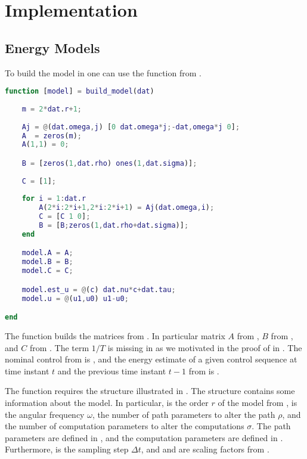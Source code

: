 
\chapter{\color{red}Implementation}
\label{app:imp}



\section{Energy Models}

To build the model in \matlab one can use the function  from .

\begin{lstlisting}[language=Matlab,caption={[Function to create the energy model]Function \stt{build\_model} that creates the energy model.},captionpos=b,label=lst:build_model]
function [model] = build_model(dat)
    
    m = 2*dat.r+1;
    
    Aj = @(dat.omega,j) [0 dat.omega*j;-dat,omega*j 0];
    A  = zeros(m);
    A(1,1) = 0;

    B = [zeros(1,dat.rho) ones(1,dat.sigma)];
        
    C = [1];
    
    for i = 1:dat.r
        A(2*i:2*i+1,2*i:2*i+1) = Aj(dat.omega,i); 
        C = [C 1 0];
        B = [B;zeros(1,dat.rho+dat.sigma)];
    end

    model.A = A;
    model.B = B;
    model.C = C;

    model.est_u = @(c) dat.nu*c+dat.tau;
    model.u = @(u1,u0) u1-u0;

end
\end{lstlisting}

The function builds the matrices from . In particular matrix $A$ from , $B$ from , and $C$ from . The term $1/T$ is missing in  as we motivated in the proof of  in . The nominal control from  is , and the energy estimate of a given control sequence at time instant $t$ and the previous time instant $t-1$ from  is . 

The function requires the structure  illustrated in . The structure contains some information about the model. In particular,  is the order $r$ of the model from ,  is the angular frequency $\omega$,  the number of path parameters to alter the path $\rho$, and  the number of computation parameters to alter the computations $\sigma$. The path parameters are defined in , and the computation parameters are defined in . Furthermore,  is the sampling step $\Delta t$, and  and  are scaling factors from .

